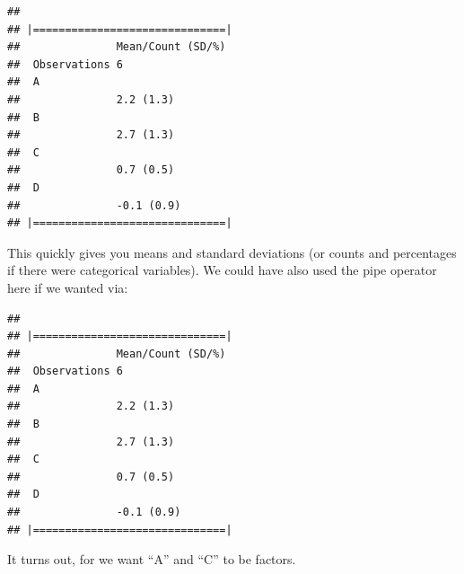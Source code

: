 \documentclass[]{tufte-book}
\newenvironment{Shaded}{}{}
\newcommand{\KeywordTok}[1]{\textcolor[rgb]{0.00,0.44,0.13}{\textbf{#1}}}
\newcommand{\DataTypeTok}[1]{\textcolor[rgb]{0.56,0.13,0.00}{#1}}
\newcommand{\StringTok}[1]{\textcolor[rgb]{0.25,0.44,0.63}{#1}}
\newcommand{\OperatorTok}[1]{\textcolor[rgb]{0.40,0.40,0.40}{#1}}
\newcommand{\NormalTok}[1]{#1}
\theoremstyle{definition}
\theoremstyle{definition}
\theoremstyle{remark}
\begin{document}
\begin{verbatim}
## 
## |==============================|
##               Mean/Count (SD/%)
##  Observations 6                
##  A                             
##               2.2 (1.3)        
##  B                             
##               2.7 (1.3)        
##  C                             
##               0.7 (0.5)        
##  D                             
##               -0.1 (0.9)       
## |==============================|
\end{verbatim}

This quickly gives you means and standard deviations (or counts and
percentages if there were categorical variables). We could have also
used the pipe operator here if we wanted via:

\begin{Shaded}
\end{Shaded}

\begin{verbatim}
## 
## |==============================|
##               Mean/Count (SD/%)
##  Observations 6                
##  A                             
##               2.2 (1.3)        
##  B                             
##               2.7 (1.3)        
##  C                             
##               0.7 (0.5)        
##  D                             
##               -0.1 (0.9)       
## |==============================|
\end{verbatim}

It turns out, for we want ``A'' and ``C'' to be factors.

\begin{Shaded}
\end{Shaded}
\end{document}
